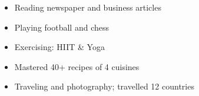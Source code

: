\twocolumnsection
{
\begin{skills}
\end{skills}}
{
\vspace{1em}
\begin{itemize}
	\item Reading newspaper and business articles
	\item Playing football and chess               \item  Exercising: HIIT \& Yoga
    \item  Mastered 40+ recipes of 4 cuisines
    \item  Traveling and photography; travelled 12 countries
\end{itemize}
}